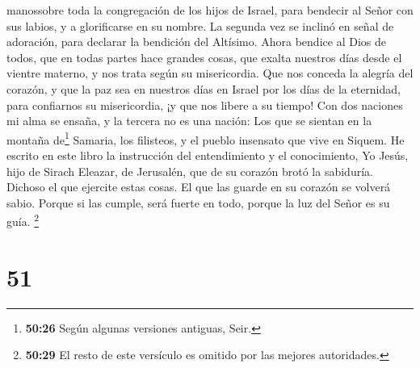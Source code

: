 manossobre toda la congregación de los hijos de Israel, para bendecir al
Señor con sus labios, y a glorificarse en su nombre.  La
segunda vez se inclinó en señal de adoración, para declarar la bendición
del Altísimo.  Ahora bendice al Dios de todos, que en
todas partes hace grandes cosas, que exalta nuestros días desde el
vientre materno, y nos trata según su misericordia.  Que
nos conceda la alegría del corazón, y que la paz sea en nuestros días en
Israel por los días de la eternidad,  para confiarnos su
misericordia, ¡y que nos libere a su tiempo!  Con dos
naciones mi alma se ensaña, y la tercera no es una nación:
 Los que se sientan en la montaña de\footnote{\textbf{50:26}
  Según algunas versiones antiguas, Seir.} Samaria, los filisteos, y el
pueblo insensato que vive en Siquem.  He escrito en este
libro la instrucción del entendimiento y el conocimiento, Yo Jesús, hijo
de Sirach Eleazar, de Jerusalén, que de su corazón brotó la sabiduría.
 Dichoso el que ejercite estas cosas. El que las guarde
en su corazón se volverá sabio.  Porque si las cumple,
será fuerte en todo, porque la luz del Señor es su guía. \footnote{\textbf{50:29}
  El resto de este versículo es omitido por las mejores autoridades.}

\hypertarget{section-50}{%
\section{51}\label{section-50}}

